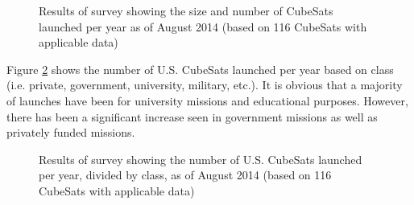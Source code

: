 \documentclass[11pt]{article}
\begin{document}
\begin{figure}[h]
\centering
{}
\caption{Results of survey showing the size and number of CubeSats launched per year as of August 2014 (based on 116 CubeSats with applicable data)}
\label{peryear}
\end{figure}

Figure \ref{classperyear} shows the number of U.S. CubeSats launched per year based on class (i.e. private, government, university, military, etc.).  It is obvious that a majority of launches have been for university missions and educational purposes.  However, there has been a significant increase seen in government missions as well as privately funded missions.  

\begin{figure}[t!]
\centering
{}
\caption{Results of survey showing the number of U.S. CubeSats launched per year, divided by class, as of August 2014 (based on 116 CubeSats with applicable data)}
\label{classperyear}
\end{figure}
\end{document}
